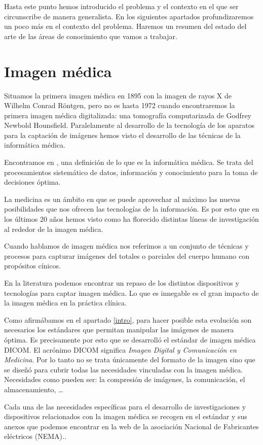 Hasta este punto hemos introducido el problema y el contexto en el que ser circunscribe de manera generalista. En los siguientes apartados profundizaremos un poco más en el contexto del problema. Haremos un resumen del estado del arte de las áreas de conocimiento que vamos a trabajar. \medskip\par

\section{Imagen médica}
Situamos la primera imagen médica en 1895 con la imagen de rayos X de  Wilhelm Conrad Röntgen, pero no es hasta 1972 cuando encontraremos la primera imagen médica digitalizada: una tomografía computarizada de Godfrey Newbold Hounsfield. Paralelamente al desarrollo de la tecnología de los aparatos para la captación de imágenes hemos visto el desarrollo de las técnicas de la informática médica.\par
Encontramos en \cite{mantas2010recommendations}, una definición de lo que es la informática médica. Se trata del procesamientos sistemático de datos, información y conocimiento para la toma de decisiones óptima.\par
La medicina es un ámbito en que se puede aprovechar al máximo las nuevas posibilidades que nos ofrecen las tecnologías de la información. Es por esto que en los últimos 20 años hemos visto como ha florecido distintas líneas de investigación al rededor de la imagen médica.\par
Cuando hablamos de imagen médica nos referimos a un conjunto de técnicas y procesos para capturar imágenes del totales o parciales del cuerpo humano con propósitos cínicos.\cite{wiki:imgmedica}\par

En la literatura \cite{Muller20041,Maintz19981} podemos encontrar un repaso de los distintos dispositivos y tecnologías para captar imagen médica. Lo que es innegable es el gran impacto de la imagen médica en la práctica clínica. \medskip \par

Como afirmábamos en el apartado \ref{intro}, para hacer posible esta evolución son necesarios los estándares que permitan manipular las imágenes de manera óptima. Es precisamente por esto que se desarrolló el estándar de imagen médica DICOM. 
El acrónimo DICOM significa \textit{Imagen Digital y Comunicación en Medicina}. Por lo tanto no se trata únicamente del formato de la imagen sino que se diseñó para cubrir todas las necesidades vinculadas con la imagen médica. Necesidades como pueden ser: la compresión de imágenes, la comunicación, el almacenamiento, \ldots\par
Cada una de las necesidades específicas para el desarrollo de investigaciones y dispositivos relacionados con la imagen médica se recogen en el estándar y sus anexos que podemos encontrar en la web de la asociación Nacional de Fabricantes eléctricos (NEMA).\cite{nema}.\medskip\par

